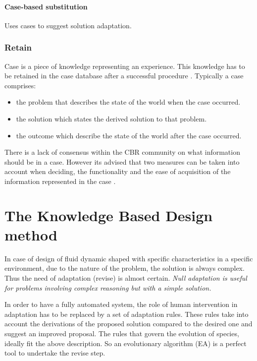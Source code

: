 \paragraph{Case-based substitution}
Uses cases to suggest solution adaptation.
\subsubsection{Retain}
\label{Retain} Case is a piece of knowledge representing an experience. This knowledge has to 
be retained in the case database after a successful procedure \cite{kolodner_1993}. Typically a case comprises:   
\begin{itemize}
	\item the problem that describes the state of the world when the case occurred.
	\item the solution which states the derived solution to that problem.
	\item the outcome which describe the state of the world after the case occurred. 
\end{itemize}

There is a lack of consensus within the CBR community on what information should be in a case. However its advised that two measures can be taken into account when deciding,
 the functionality and the ease of acquisition of the information represented in the case \cite{kolodner_1993}. 


\section{The Knowledge Based Design method}

In case of design of fluid dynamic shaped with specific characteristics in a specific environment, due to the nature of the problem, the solution is always complex. Thus the need of adaptation (revise) is almost certain. \textit{Null adaptation is useful for problems involving complex reasoning but with a simple solution.}

In order to have a fully automated system, the role of human intervention in adaptation has to be replaced by a set of adaptation rules. These rules take into account the derivations of the proposed solution compared to the desired one and suggest an improved proposal. The rules that govern the evolution of species, ideally fit the above description. So an  evolutionary algorithm (EA) is a perfect tool to undertake the revise step. 


